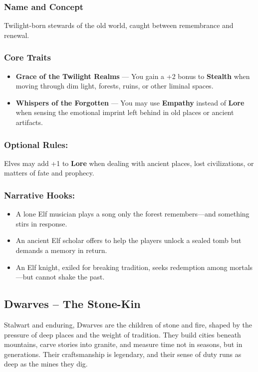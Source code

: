 \subsubsection{Name and Concept}

Twilight-born stewards of the old world, caught between remembrance and renewal.

\subsubsection*{Core Traits}
\begin{itemize}
  \item \textbf{Grace of the Twilight Realms} — You gain a +2 bonus to \textbf{Stealth} when moving through dim light, forests, ruins, or other liminal spaces.
  \item \textbf{Whispers of the Forgotten} — You may use \textbf{Empathy} instead of \textbf{Lore} when sensing the emotional imprint left behind in old places or ancient artifacts.
\end{itemize}

\subsubsection{Optional Rules:} Elves may add +1 to \textbf{Lore} when dealing with ancient places, lost civilizations, or matters of fate and prophecy.

\subsubsection{Narrative Hooks:}
\begin{itemize}
  \item A lone Elf musician plays a song only the forest remembers—and something stirs in response.
  \item An ancient Elf scholar offers to help the players unlock a sealed tomb but demands a memory in return.
  \item An Elf knight, exiled for breaking tradition, seeks redemption among mortals—but cannot shake the past.
\end{itemize}



\subsection*{Dwarves – The Stone-Kin}

Stalwart and enduring, Dwarves are the children of stone and fire, shaped by the pressure of deep places and the weight of tradition. They build cities beneath mountains, carve stories into granite, and measure time not in seasons, but in generations. Their craftsmanship is legendary, and their sense of duty runs as deep as the mines they dig.


